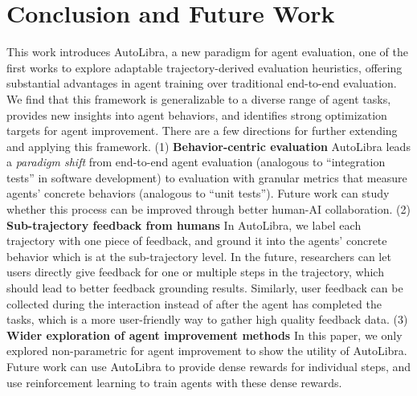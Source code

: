 \documentclass[../main.tex]{subfiles}
\begin{document}
\section{Conclusion and Future Work}
This work introduces AutoLibra, a new paradigm for agent evaluation, one of
the first works to explore adaptable trajectory-derived evaluation heuristics,
offering substantial advantages in agent training over traditional end-to-end
evaluation. We find that this framework is generalizable to a diverse range of agent
tasks, provides new insights into agent behaviors, and identifies strong optimization
targets for agent improvement. There are a few directions for further extending
and applying this framework.
(1) \textbf{Behavior-centric evaluation} AutoLibra leads a \emph{paradigm shift}
from end-to-end agent evaluation (analogous to ``integration tests'' in software
development) to evaluation with granular metrics that measure agents' concrete behaviors
(analogous to ``unit tests''). Future work can study whether this process can be
improved through better human-AI collaboration.
(2) \textbf{Sub-trajectory feedback from humans} In AutoLibra, we label each
trajectory with one piece of feedback, and ground it into the agents' concrete
behavior which is at the sub-trajectory level. In the future, researchers can
let users directly give feedback for one or multiple steps in the trajectory, which
should lead to better feedback grounding results. Similarly, user feedback can be
collected during the interaction instead of after the agent has completed the tasks,
which is a more user-friendly way to gather high quality feedback data.
(3) \textbf{Wider exploration of agent improvement methods} In this paper, we only
explored non-parametric for agent improvement to show the utility of AutoLibra. Future work can use AutoLibra to provide dense rewards for individual
steps, and use reinforcement learning to train agents with these dense rewards.
\end{document}
